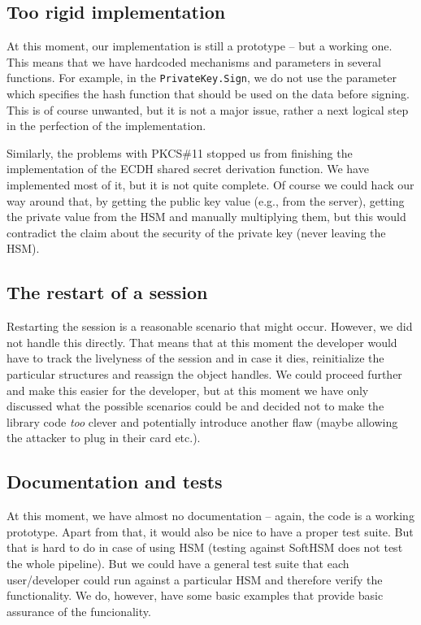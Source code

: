 \documentclass[a4paper]{scrartcl}
\begin{document}
\subsection{Too rigid implementation}
At this moment, our implementation is still a prototype -- but a working one. This means that we have hardcoded mechanisms and parameters in several functions. For example, in the \lstinline[columns=fixed]{PrivateKey.Sign}, we do not use the parameter which specifies the hash function that should be used on the data before signing. This is of course unwanted, but it is not a major issue, rather a next logical step in the perfection of the implementation.

Similarly, the problems with PKCS\#11 stopped us from finishing the implementation of the ECDH shared secret derivation function. We have implemented most of it, but it is not quite complete. Of course we could hack our way around that, by getting the public key value (e.g., from the server), getting the private value from the HSM and manually multiplying them, but this would contradict the claim about the security of the private key (never leaving the HSM).

\subsection{The restart of a session}
Restarting the session is a reasonable scenario that might occur. However, we did not handle this directly. That means that at this moment the developer would have to track the livelyness of the session and in case it dies, reinitialize the particular structures and reassign the object handles. We could proceed further and make this easier for the developer, but at this moment we have only discussed what the possible scenarios could be and decided not to make the library code \textit{too} clever and potentially introduce another flaw (maybe allowing the attacker to plug in their card etc.).

\subsection{Documentation and tests}
At this moment, we have almost no documentation -- again, the code is a working prototype. Apart from that, it would also be nice to have a proper test suite. But that is hard to do in case of using HSM (testing against SoftHSM does not test the whole pipeline). But we could have a general test suite that each user/developer could run against a particular HSM and therefore verify the functionality. We do, however, have some basic examples that provide basic assurance of the funcionality.
\end{document}
